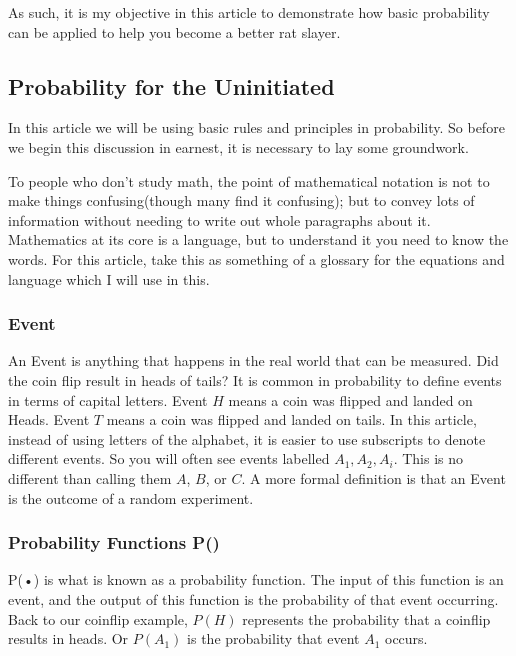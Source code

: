 \documentclass{article}
\begin{document}
As such, it is my objective in this article to demonstrate how basic probability can be applied to help you become a better rat slayer.

\subsection*{Probability for the Uninitiated}
\par

In this article we will be using basic rules and principles in probability. So before we begin this discussion in earnest, it is necessary to lay some groundwork.

To people who don't study math, the point of mathematical notation is not to make things confusing(though many find it confusing); but to convey lots of information without needing to write out whole paragraphs about it. Mathematics at its core is a language, but to understand it you need to know the words. For this article, take this as something of a glossary for the equations and language which I will use in this.

\subsubsection{\textbf{Event}}

An Event is anything that happens in the real world that can be measured. Did the coin flip result in heads of tails? It is common in probability to define events in terms of capital letters. Event $H$ means a coin was flipped and landed on Heads. Event $T$ means a coin was flipped and landed on tails. In this article, instead of using letters of the alphabet, it is easier to use subscripts to denote different events. So you will often see events labelled $A_1,A_2,A_i$. This is no different than calling them $A$, $B$, or $C$. A more formal definition is that an Event is the outcome of a random experiment.

\subsubsection{Probability Functions \textbf{P()}}

P(•) is what is known as a probability function. The input of this function is an event, and the output of this function is the probability of that event occurring. Back to our coinflip example, $P(H)$ represents the probability that a coinflip results in heads. Or $P(A_1)$ is the probability that event $A_1$ occurs.
\end{document}
